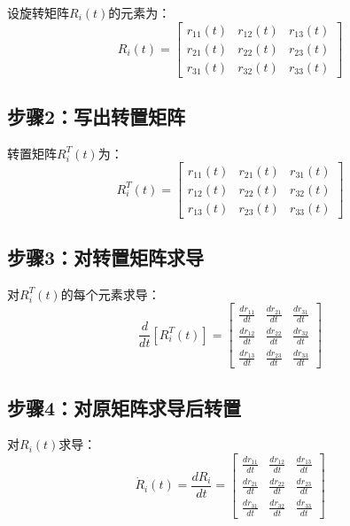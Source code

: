 \documentclass[12pt,a4paper]{article}
\begin{document}
设旋转矩阵$R_i(t)$的元素为：
\begin{equation}
R_i(t) = \begin{bmatrix}
r_{11}(t) & r_{12}(t) & r_{13}(t) \\
r_{21}(t) & r_{22}(t) & r_{23}(t) \\
r_{31}(t) & r_{32}(t) & r_{33}(t)
\end{bmatrix}
\end{equation}

\subsection{步骤2：写出转置矩阵}

转置矩阵$R_i^T(t)$为：
\begin{equation}
R_i^T(t) = \begin{bmatrix}
r_{11}(t) & r_{21}(t) & r_{31}(t) \\
r_{12}(t) & r_{22}(t) & r_{32}(t) \\
r_{13}(t) & r_{23}(t) & r_{33}(t)
\end{bmatrix}
\end{equation}

\subsection{步骤3：对转置矩阵求导}

对$R_i^T(t)$的每个元素求导：
\begin{equation}
\frac{d}{dt}[R_i^T(t)] = \begin{bmatrix}
\frac{dr_{11}}{dt} & \frac{dr_{21}}{dt} & \frac{dr_{31}}{dt} \\
\frac{dr_{12}}{dt} & \frac{dr_{22}}{dt} & \frac{dr_{32}}{dt} \\
\frac{dr_{13}}{dt} & \frac{dr_{23}}{dt} & \frac{dr_{33}}{dt}
\end{bmatrix}
\end{equation}

\subsection{步骤4：对原矩阵求导后转置}

对$R_i(t)$求导：
\begin{equation}
\dot{R}_i(t) = \frac{dR_i}{dt} = \begin{bmatrix}
\frac{dr_{11}}{dt} & \frac{dr_{12}}{dt} & \frac{dr_{13}}{dt} \\
\frac{dr_{21}}{dt} & \frac{dr_{22}}{dt} & \frac{dr_{23}}{dt} \\
\frac{dr_{31}}{dt} & \frac{dr_{32}}{dt} & \frac{dr_{33}}{dt}
\end{bmatrix}
\end{equation}
\end{document}
